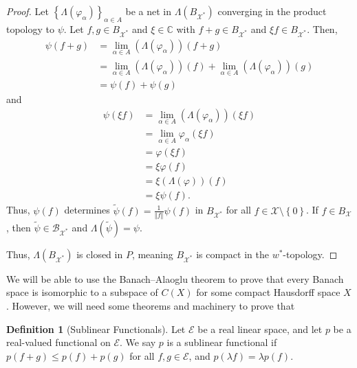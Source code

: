 \documentclass[12pt]{extarticle}
\newcommand{\C}{\mathbb{C}}
\newcommand{\norm}[1]{\left\Vert #1\right\Vert}
\newcommand{\set}[1]{\left\{#1\right\}}
\theoremstyle{plain}
\theoremstyle{definition}
\newtheorem*{definition}{Definition}
\theoremstyle{note}
\renewcommand{\newline}{\hfill\break}
\begin{document}
\begin{proof}
  Let $\set{\Lambda\left(\varphi_{\alpha}\right)}_{\alpha\in A}$ be a net in $\Lambda\left(B_{\mathcal{X}^{\ast}}\right)$ converging in the product topology to $\psi$. Let $f,g \in B_{\mathcal{X}^{\ast}}$ and $\xi \in \C$ with $f+g\in B_{\mathcal{X}^{\ast}}$ and $\xi f \in B_{\mathcal{X}^{\ast}}$. Then,
  \begin{align*}
    \psi\left(f+g\right) &= \lim_{\alpha \in A}\left(\Lambda\left(\varphi_{\alpha}\right)\right)(f+g)\\
                         &= \lim_{\alpha \in A}\left(\Lambda\left(\varphi_{\alpha}\right)\right)(f) + \lim_{\alpha \in A}\left(\Lambda\left(\varphi_{\alpha}\right)\right)(g)\\
                         &= \psi(f) + \psi(g)
  \end{align*}
  and
  \begin{align*}
    \psi(\xi f) &= \lim_{\alpha \in A}\left(\Lambda\left(\varphi_{\alpha}\right)\right)(\xi f)\\
                 &= \lim_{\alpha \in A}\varphi_{\alpha}\left(\xi f\right)\\
                 &= \varphi\left(\xi f\right)\\
                 &= \xi \varphi\left(f\right)\\
                 &= \xi \left(\Lambda\left(\varphi\right)\right)(f)\\
                 &= \xi \psi(f).
  \end{align*}
  Thus, $\psi(f)$ determines $\tilde{\psi}(f) = \frac{1}{\norm{f}}\psi\left(f\right)$ in $B_{\mathcal{X}^{\ast}}$ for all $f\in \mathcal{X}\setminus \set{0}$. If $f\in B_{\mathcal{X}}$, then $\tilde{\psi} \in \mathcal{B}_{\mathcal{X}^{\ast}}$ and $\Lambda(\tilde{\psi}) = \psi$.\newline

  Thus, $\Lambda\left(B_{\mathcal{X}^{\ast}}\right)$ is closed in $P$, meaning $B_{\mathcal{X}^{\ast}}$ is compact in the $w^{\ast}$-topology.
\end{proof}
We will be able to use the Banach--Alaoglu theorem to prove that every Banach space is isomorphic to a subspace of $C(X)$ for some compact Hausdorff space $X$. However, we will need some theorems and machinery to prove that
\begin{definition}[Sublinear Functionals]
  Let $\mathcal{E}$ be a real linear space, and let $p$ be a real-valued functional on $\mathcal{E}$. We say $p$ is a sublinear functional if $p(f+g)\leq p(f) + p(g)$ for all $f,g\in \mathcal{E}$, and $p(\lambda f) = \lambda p(f)$.
\end{definition}
\end{document}
